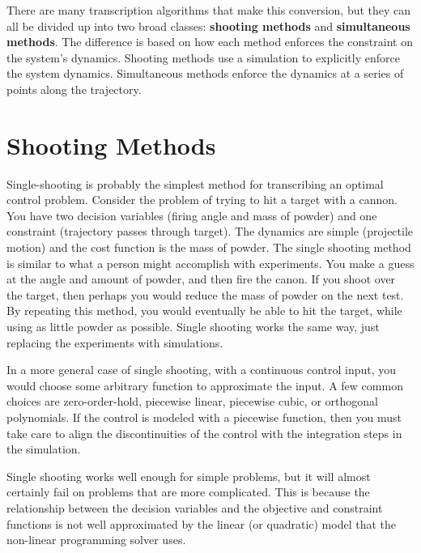 There are many transcription algorithms that make this conversion, but they can all be divided up into two broad classes: {\bf shooting methods} and {\bf simultaneous methods}. The difference is based on how each method enforces the constraint on the system's dynamics. Shooting methods use a simulation to explicitly enforce the system dynamics. Simultaneous methods enforce the dynamics at a series of points along the trajectory.






\section{Shooting Methods}

Single-shooting is probably the simplest method for transcribing an optimal control problem. Consider the problem of trying to hit a target with a cannon. You have two decision variables (firing angle and mass of powder) and one constraint (trajectory passes through target). The dynamics are simple (projectile motion) and the cost function is the mass of powder. The single shooting method is similar to what a person might accomplish with experiments. You make a guess at the angle and amount of powder, and then fire the canon. If you shoot over the target, then perhaps you would reduce the mass of powder on the next test. By repeating this method, you would eventually be able to hit the target, while using as little powder as possible. Single shooting works the same way, just replacing the experiments with simulations.

\par In a more general case of single shooting, with a continuous control input, you would choose some arbitrary function to approximate the input. A few common choices are zero-order-hold, piecewise linear, piecewise cubic, or orthogonal polynomials. If the control is modeled with a piecewise function, then you must take care to align the discontinuities of the control with the integration steps in the simulation.

\par Single shooting works well enough for simple problems, but it will almost certainly fail on problems that are more complicated. This is because the relationship between the decision variables and the objective and constraint functions is not well approximated by the linear (or quadratic) model that the non-linear programming solver uses. 

